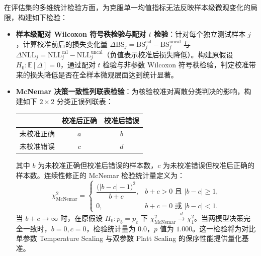 在评估集的多维统计检验方面，为克服单一均值指标无法反映样本级微观变化的局限，构建如下检验：
\begin{itemize}
\item \textbf{样本级配对 Wilcoxon 符号秩检验与配对 $t$ 检验}：针对每个独立测试样本 $j$，计算校准前后的损失变化量 $\Delta \mathrm{BS}_j = \mathrm{BS}_j^{\mathrm{cal}} - \mathrm{BS}_j^{\mathrm{uncal}}$ 与 $\Delta \mathrm{NLL}_j = \mathrm{NLL}_j^{\mathrm{cal}} - \mathrm{NLL}_j^{\mathrm{uncal}}$（负值表示校准后损失降低）。构建原假设 $H_0: \mathbb{E}[\Delta] = 0$，通过配对 $t$ 检验与非参数 Wilcoxon 符号秩检验，判定校准带来的损失降低是否在全样本微观层面达到统计显著。
\item \textbf{McNemar 决策一致性列联表检验}：为核验校准对离散分类判决的影响，构建如下 $2 \times 2$ 分类正误列联表：
\begin{center}\small
\begin{tabular}{lcc}
\toprule
 & 校准后正确 & 校准后错误 \\
\midrule
未校准正确 & $a$ & $b$ \\
未校准错误 & $c$ & $d$ \\
\bottomrule
\end{tabular}
\end{center}
其中 $b$ 为未校准正确但校准后错误的样本数，$c$ 为未校准错误但校准后正确的样本数。连续性修正的 McNemar 检验统计量定义为：
\begin{equation}\label{eq:mcnemar_stat}
\chi^2_{\mathrm{McNemar}} =
\begin{cases}
\dfrac{\big(|b - c| - 1\big)^2}{b + c}, & b + c > 0 \text{ 且 } |b - c| \ge 1, \\[6pt]
0, & b + c = 0 \text{ 或 } |b - c| < 1.
\end{cases}
\end{equation}
当 $b + c \to \infty$ 时，在原假设 $H_0: p_b = p_c$ 下 $\chi^2_{\mathrm{McNemar}} \xrightarrow{d} \chi^2_1$。当两模型决策完全一致时，$b=0, c=0$，检验统计量为 $0.0$，$p$ 值为 $1.000$。这一检验将为对比单参数 Temperature Scaling 与双参数 Platt Scaling 的保序性能提供量化基准。
\end{itemize}
